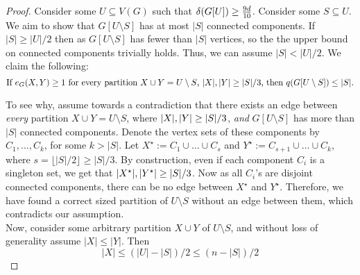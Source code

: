 \documentclass[11pt]{article}
\begin{document}
\begin{proof}
  Consider some $U \subseteq V(G)$ such that $\delta(G[U]) \ge \cTilde$.
  Consider some $S \subseteq U$.
  We aim to show that $G[U \setminus S]$ has at most $|S|$ connected components.
  If $|S| \ge |U|/2$ then as $G[U \setminus S]$ has fewer than $|S|$ vertices, so the the upper bound on connected components trivially holds. 
Thus, we can assume $|S| < |U|/2$.
 We claim the following:
 \begin{equation}
  \text{If }\CutEdges{X}{Y}{G} \ge 1 \text{ for every partition $X \cup Y = U \setminus S$, $|X|,|Y| \ge |S|/3$,  then }  q(G[U \setminus S]) \le |S|. \label{eq:mini-claim}
 \end{equation}

\flushleft
To see why, assume towards a contradiction that there exists an edge between \emph{every} partition $X \cup Y = U \setminus S$, where $|X|, |Y| \ge \Size{S}/3$, \emph{and} $G[U \setminus S]$ has more than $|S|$ connected components. Denote the  vertex sets of these components by $C_1, \ldots, C_k$, for some $k > |S|$.
Let $X^\star := C_1 \cup \ldots \cup C_{s}$ and $Y^\star := C_{s+1} \cup \ldots \cup C_{k}$, where $s = \lfloor |S|/2 \rfloor \ge |S|/3$.
By construction, even if each component $C_i$ is a singleton set, we get that  $\Size{X^\star}, \Size{Y^\star} \ge \Size{S}/3$.
Now as all $C_i$'s are disjoint connected components, there can be no edge between $X^\star$ and $Y^\star$. Therefore, we have found a correct sized partition of $U \setminus S$ without an edge between them, which contradicts our assumption. \\
\flushleft
Now, consider some arbitrary partition $X \cup Y$ of $U \setminus S$, and without loss of generality assume $|X| \le |Y|$. Then
\begin{equation}
|X| \le (|U| - |S|)/2 \le (n - |S|)/2  \label{eq:upp-X}
\end{equation}


\end{proof}
\end{document}
